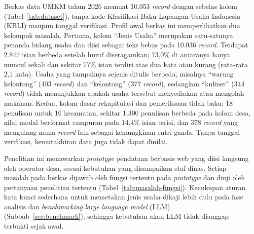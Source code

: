 Berkas data UMKM tahun 2026 memuat 10.053 \textit{record} dengan sebelas kolom (Tabel~\ref{tab:dataset}), tanpa kode Klasifikasi Baku Lapangan Usaha Indonesia (KBLI) maupun tanggal verifikasi. Profil awal berkas ini memperlihatkan dua kelompok masalah. Pertama, kolom ``Jenis Usaha'' merupakan satu-satunya penanda bidang usaha dan diisi sebagai teks bebas pada 10.036 \textit{record}. Terdapat 2.847 isian berbeda setelah huruf diseragamkan; 73,0\% di antaranya hanya muncul sekali dan sekitar 77\% isian terdiri atas dua kata atau kurang (rata-rata 2,1 kata). Usaha yang tampaknya sejenis ditulis berbeda, misalnya ``warung kelontong'' (403 \textit{record}) dan ``kelontong'' (377 \textit{record}), sedangkan ``kuliner'' (344 \textit{record}) tidak menunjukkan apakah usaha tersebut menyediakan atau mengolah makanan. Kedua, kolom dasar rekapitulasi dan pemeriksaan tidak baku: 18 penulisan untuk 16 kecamatan, sekitar 1.300 penulisan berbeda pada kolom desa, nilai modal berformat campuran pada 14,4\% isian terisi, dan 378 \textit{record} yang mengulang nama \textit{record} lain sebagai kemungkinan entri ganda. Tanpa tanggal verifikasi, kemutakhiran data juga tidak dapat dinilai.

Penelitian ini menawarkan \textit{prototype} pendataan berbasis web yang diisi langsung oleh operator desa, sesuai kebutuhan yang disampaikan staf dinas. Setiap masalah pada berkas dijawab oleh fungsi tertentu pada \textit{prototype} dan diuji oleh pertanyaan penelitian tertentu (Tabel~\ref{tab:masalah-fungsi}). Kecukupan aturan kata kunci sederhana untuk memetakan jenis usaha dikaji lebih dulu pada fase analisis dan \textit{benchmarking} \textit{large language model} (LLM) (Subbab~\ref{sec:benchmark}), sehingga kebutuhan akan LLM tidak dianggap terbukti sejak awal.

